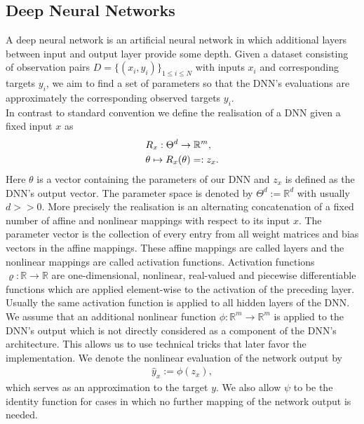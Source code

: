 \documentclass[conference]{IEEEtran}
\begin{document}
	\subsection{Deep Neural Networks}
	\noindent
	A deep neural network is an artificial neural network in which additional layers between input and output layer provide some depth. Given a dataset consisting of observation pairs $D =\{(x_{i}, y_{i})\}_{1\leq i\leq N}$ with inputs $x_{i}$ and corresponding targets $y_{i}$, we aim to find a set of parameters so that the DNN's evaluations are approximately the corresponding observed targets $y_{i}$.\\
	In contrast to standard convention we define the realisation of a DNN given a fixed input $x$ as 
	\begin{align}
	&R_{x}:\Theta^{d}\rightarrow\mathbb{R}^{m}, \notag\\
	&\theta\mapsto R_{x}(\theta) =: z_{x}. 
	\end{align}
	Here $\theta$ is a vector containing the parameters of our DNN and $z_{x}$ is defined as the DNN's output vector. The parameter space is denoted by $\Theta^{d} := \mathbb{R}^{d}$ with usually $d>>0$. More precisely the realisation is an alternating concatenation of a fixed number of affine and nonlinear mappings with respect to its input $x$. The parameter vector is the collection of every entry from all weight matrices and bias vectors in the affine mappings. These affine mappings are called layers and the nonlinear mappings are called activation functions. Activation functions $\varrho:\mathbb{R}\rightarrow\mathbb{R}$ are one-dimensional, nonlinear, real-valued and piecewise differentiable functions which are applied element-wise to the activation of the preceding layer. Usually the same activation function is applied to all hidden layers of the DNN. We assume that an additional nonlinear function $\phi:\mathbb{R}^{m}\rightarrow\mathbb{R}^{m}$ is applied to the DNN's output which is not directly considered as a component of the DNN's architecture. This allows us to use technical tricks that later favor the implementation. We denote the nonlinear evaluation of the network output by 
	\begin{align}
	\hat{y}_{x} := \phi(z_{x}),
	\end{align}
	which serves as an approximation to the target $y$. We also allow $\psi$ to be the identity function for cases in which no further mapping of the network output is needed.
	
	
\end{document}
